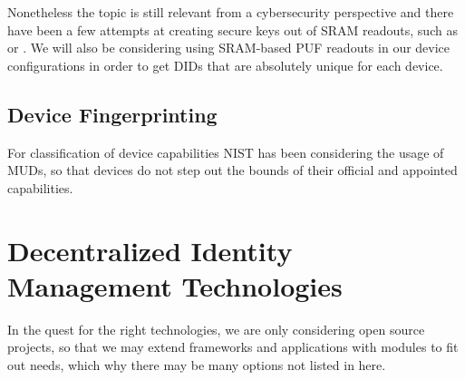 Nonetheless the topic is still relevant from a cybersecurity perspective and there have been a few attempts at creating
secure keys out of SRAM readouts, such as \cite{vinagrero2023sram} or \cite{Niya_Jeffrey_Stiller_2020}.
We will also be considering using SRAM-based PUF readouts in our device configurations in order to get DIDs that are
absolutely unique for each device.

\subsection{Device Fingerprinting} %
\label{sub:Device Fingerprinting}
For classification of device capabilities NIST has been considering the usage of MUDs, so that devices do not step out
the bounds of their official and appointed capabilities. \cite{dodson2021securing}


\section{Decentralized Identity Management Technologies} %
\label{sec:Decentralized Identity Management Technologies}

In the quest for the right technologies, we are only considering open source projects, so that we may extend frameworks
and applications with modules to fit out needs, which why there may be many options not listed in here.

